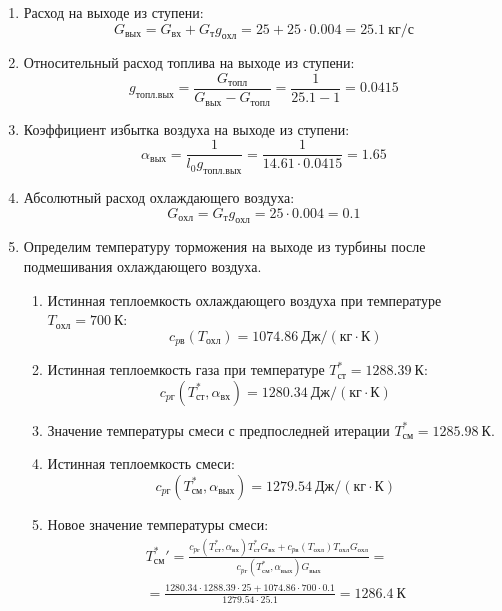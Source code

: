 \documentclass[a4paper,10pt]{article}
\begin{document}
\begin{enumerate}
        \item Расход на выходе из ступени:
        \[
            G_{вых} = G_{вх} + G_т g_{охл} =
                25 + 25 \cdot
                0.004 =
            25.1 \ кг/с
        \]

        \item Относительный расход топлива на выходе из ступени:
        \[
            g_{топл.вых} = \frac{ G_{топл} }{ G_{вых} - G_{топл} } =
                 \frac{ 1 }{ 25.1 - 1 } =
            0.0415
        \]

        \item Коэффициент избытка воздуха на выходе из ступени:
        \[
            \alpha_{вых} = \frac{ 1 }{ l_0 g_{топл.вых} } =
                \frac{ 1 }{ 14.61 \cdot 0.0415 } =
            1.65
        \]

        \item Абсолютный расход охлаждающего воздуха:
        \[
            G_{охл} = G_т g_{охл} = 25 \cdot 0.004 =
            0.1
        \]

        \item Определим температуру торможения на выходе из турбины после подмешивания охлаждающего воздуха.
        \begin{enumerate}

            \item Истинная теплоемкость охлаждающего воздуха при температуре $T_{охл} = 700\ К $:
            \[
                c_{pв} (T_{охл}) = 1074.86\ Дж/ (кг \cdot К)
            \]

            \item Истинная теплоемкость газа при температуре $T_{ст}^* = 1288.39 \ К $:
            \[
                c_{pг} (T_{ст}^*, \alpha_{вх}) =
                1280.34\ Дж/ (кг \cdot К)
            \]

            \item Значение температуры смеси с предпоследней итерации $T_{см}^{*} = 1285.98\ К$.

            \item Истинная теплоемкость смеси:
            \[
                c_{pг} (T_{см}^{*}, \alpha_{вых}) =
                1279.54\ Дж/ (кг \cdot К)
            \]

            \item Новое значение температуры смеси:
            \begin{gather*}
                T_{см}^*\prime = \frac{
                        c_{pг} (T_{ст}^*, \alpha_{вх}) T_{ст}^* G_{вх} + c_{pв} (T_{охл}) T_{охл} G_{охл}
                    }{
                        c_{pг} (T_{см}^{*}, \alpha_{вых}) G_{вых}
                    } =\\
                = \frac{
                    1280.34
                    \cdot 1288.39 \cdot 25 +
                    1074.86
                    \cdot 700 \cdot 0.1
                }{
                    1279.54
                    \cdot  25.1
                } =
                1286.4\ К\\
            \end{gather*}


\end{enumerate}
\end{enumerate}
\end{document}
